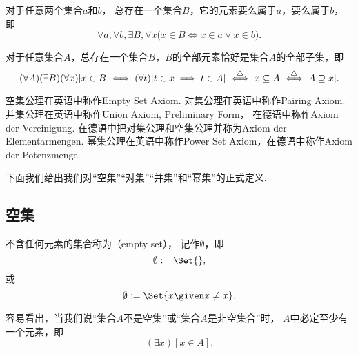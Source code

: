 \begin{axiom}[并集公理I]
对于任意两个集合\(a\)和\(b\)，
总存在一个集合\(B\)，它的元素要么属于\(a\)，要么属于\(b\)，即\begin{equation*}
	\forall a, \forall b, \exists B, \forall x
	\bigl(
		x \in B
		\iff
		x \in a \lor x \in b
	\bigr).
\end{equation*}
\end{axiom}

\begin{axiom}[幂集公理]
对于任意集合\(A\)，总存在一个集合\(B\)，\(B\)的全部元素恰好是集合\(A\)的全部子集，即\begin{equation*}
	(\forall A)(\exists B)(\forall x)
	[
		x \in B
		\iff
		(\forall t)[t \in x \implies t \in A]
		\overset{\triangle}{\iff}
		x \subseteq A
		\overset{\triangle}{\iff}
		A \supseteq x
	].
\end{equation*}
\end{axiom}


空集公理在英语中称作Empty Set Axiom.
对集公理在英语中称作Pairing Axiom.
并集公理在英语中称作Union Axiom, Preliminary Form，
在德语中称作Axiom der Vereinigung.
在德语中把对集公理和空集公理并称为Axiom der Elementarmengen.
幂集公理在英语中称作Power Set Axiom，在德语中称作Axiom der Potenzmenge.

下面我们给出我们对“空集”“对集”“并集”和“幂集”的正式定义.

\subsection{空集}
\begin{definition}
不含任何元素的集合称为（empty set），
记作\(\emptyset\)，即
\begin{equation}
	\emptyset \defeq \Set{},
\end{equation}
或
\begin{equation}
	\emptyset \defeq \Set{ x \given x \neq x }.
\end{equation}
\end{definition}

容易看出，当我们说“集合\(A\)不是空集”或“集合\(A\)是非空集合”时，
\(A\)中必定至少有一个元素，即\begin{equation*}
	(\exists x)[x \in A].
\end{equation*}

